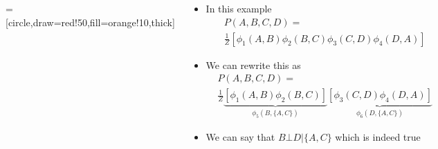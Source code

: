 \documentclass[serif,aspectratio=169,dvipsnames]{beamer}
\begin{document}
\begin{frame}
	\begin{columns}
		\begin{overlayarea}{\textwidth}{\textheight}
			\begin{center}
					=[circle,draw=red!50,fill=orange!10,thick]
				\end{center}

		\end{overlayarea}
		\begin{overlayarea}{\textwidth}{\textheight}
			\begin{itemize}[<+->]\justifying
				\item In this example
				\begin{align*}
					&P(A,B,C,D) =\\
					&\frac{1}{Z} [ \phi_1(A,B) \phi_2(B,C) \phi_3(C,D) \phi_4(D,A)]
				\end{align*}
				\item We can rewrite this as 
				\begin{align*}
					&P(A,B,C,D) =\\
					&\frac{1}{Z} \underbrace{[ \phi_1(A,B) \phi_2(B,C) ]}_{\phi_5(B,\{A,C\})} \underbrace{[\phi_3(C,D) \phi_4(D,A)]}_{\phi_6(D,\{A,C\})}
				\end{align*}
				\item We can say that $B \bot D|\{A,C\}$ which is indeed true
			\end{itemize}
		\end{overlayarea}
	\end{columns}
\end{frame}
\end{document}
